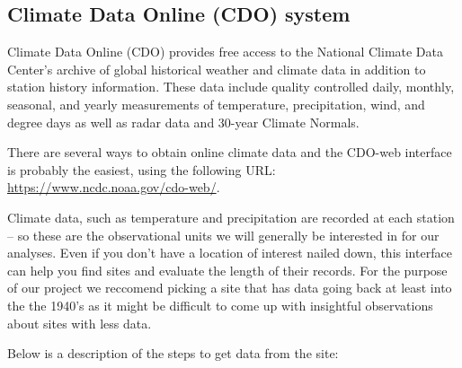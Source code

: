 \documentclass{article}\usepackage[]{graphicx}\usepackage[]{xcolor}
\begin{document}
\subsection{Climate Data Online (CDO) system}

Climate Data Online (CDO) provides free access to the National Climate Data Center's archive of global historical weather and climate data in addition to station history information. These data include quality controlled daily, monthly, seasonal, and yearly measurements of temperature, precipitation, wind, and degree days as well as radar data and 30-year Climate Normals. 

There are several ways to obtain online climate data and the CDO-web interface is probably the easiest, using the following URL: \url{https://www.ncdc.noaa.gov/cdo-web/}. 

Climate data, such as temperature and precipitation are recorded at each station -- so these are the observational units we will generally be interested in for our analyses. Even if you don't have a location of interest nailed down, this interface can help you find sites and evaluate the length of their records. For the purpose of our project we reccomend picking a site that has data going back at least into the the 1940's as it might be difficult to come up with insightful observations about sites with less data. 

Below is a description of the steps to get data from the site:
\end{document}
